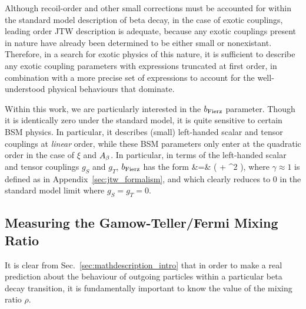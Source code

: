 Although recoil-order and other small corrections must be accounted for within the standard model description of beta decay, in the case of exotic couplings, leading order \ac{JTW} description is adequate, because any exotic couplings present in nature have already been determined to be either small or nonexistant.  Therefore, in a search for exotic physics of this nature, it is sufficient to describe any exotic coupling parameters with expressions truncated at first order, in combination with a more precise set of expressions to account for the well-understood physical behaviours that dominate.  

Within this work, we are particularly interested in the $b_{\mathrm{Fierz}}$ parameter.  Though it is identically zero under the standard model, it is quite sensitive to certain \ac{BSM} physics.  In particular, it describes (small) left-handed scalar and tensor couplings at \emph{linear} order, while these \ac{BSM} parameters only enter at the quadratic order in the case of $\xi$ and $A_{\beta}$.  In particular, in terms of the left-handed scalar and tensor couplings $g_S$ and $g_T$, $b_{\mathrm{Fierz}}$ has the form 
\bea
\bFierz &=&  \left(  + \rho^2  \right), 
\eea
where $\gamma \approx 1$ is defined as in Appendix~\ref{sec:jtw_formalism}, and
which clearly reduces to 0 in the standard model limit where $g_S = g_T = 0$.








\subsection{Measuring the Gamow-Teller/Fermi Mixing Ratio}
\label{sec:extractinglambda}
It is clear from Sec.~\ref{sec:mathdescription_intro} that in order to make a real prediction about the behaviour of outgoing particles within a particular beta decay transition, it is fundamentally important to know the value of the mixing ratio $\rho$.

